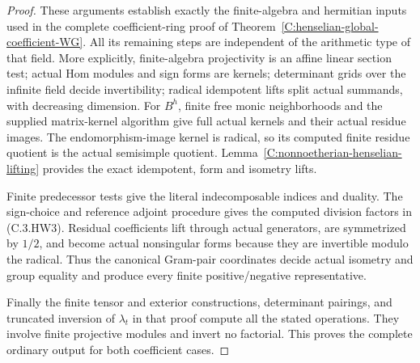 \begin{proof}
These arguments establish
exactly the finite-algebra
and hermitian inputs used in
the complete coefficient-ring
proof of
Theorem~\ref{C:henselian-global-coefficient-WG}.
All its remaining steps are
independent of the arithmetic
type of that field.
More explicitly, finite-algebra
projectivity is an affine
linear section test; actual
Hom modules and sign forms
are kernels; determinant
grids over the infinite field
decide invertibility; radical
idempotent lifts split actual
summands, with decreasing
dimension.
For $B^h$, finite free monic
neighborhoods and the supplied
matrix-kernel algorithm give
full actual kernels and
their actual residue images.
The endomorphism-image kernel
is radical, so its computed
finite residue quotient is
the actual semisimple quotient.
Lemma~\ref{C:nonnoetherian-henselian-lifting}
provides the exact idempotent,
form and isometry lifts.

Finite predecessor tests give
the literal indecomposable
indices and duality.
The sign-choice and reference
adjoint procedure gives the
computed division factors in
(C.3.HW3).
Residual coefficients lift
through actual generators,
are symmetrized by $1/2$,
and become actual nonsingular
forms because they are
invertible modulo the radical.
Thus the canonical Gram-pair
coordinates decide actual
isometry and group equality
and produce every finite
positive/negative representative.

Finally the finite tensor and
exterior constructions, determinant
pairings, and truncated inversion
of $\lambda_t$ in that proof
compute all the stated operations.
They involve finite projective
modules and invert no factorial.
This proves the complete ordinary
output for both coefficient cases.
\end{proof}

